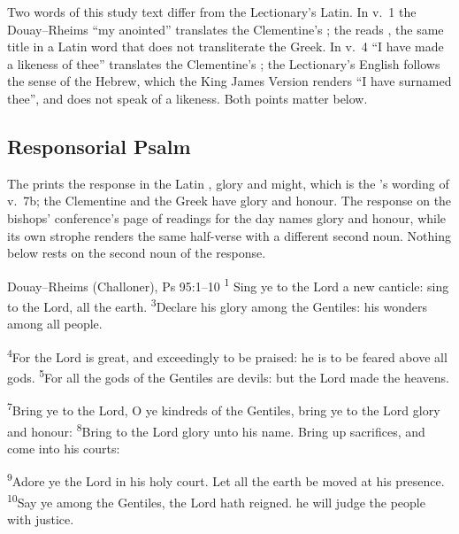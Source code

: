 \noindent Two words of this study text differ from the Lectionary's Latin.
In v.~1 the Douay--Rheims ``my anointed'' translates the Clementine's
; the  reads , the same title
in a Latin word that does not transliterate the Greek. In v.~4 ``I have made a
likeness of thee'' translates the Clementine's ; the
Lectionary's English follows the sense of the Hebrew, which the King James
Version renders ``I have surnamed thee'', and does not speak of a likeness.
Both points matter below.

\subsection{Responsorial Psalm}
\label{proper-responsorial-psalm}


\noindent The  prints the response in the Latin , glory and might, which is the 's wording of v.~7b; the Clementine and the Greek have glory and
honour. The response on the bishops' conference's page of readings for the day
names glory and honour, while its own strophe renders the same half-verse with
a different second noun. Nothing below rests on the second noun of the
response.

\begin{englishwitness}{Douay--Rheims (Challoner), Ps 95:1--10}
\textsuperscript{1} Sing ye to the Lord a new canticle: sing to the
Lord, all the earth. 
\textsuperscript{3}Declare his glory among the Gentiles: his wonders among all
people.

\textsuperscript{4}For the Lord is great, and exceedingly to be praised: he is
to be feared above all gods. \textsuperscript{5}For all the gods of the
Gentiles are devils: but the Lord made the heavens. 

\textsuperscript{7}Bring ye to the Lord, O ye kindreds of the Gentiles, bring
ye to the Lord glory and honour: \textsuperscript{8}Bring to the Lord glory
unto his name. Bring up sacrifices, and come into his courts:

\textsuperscript{9}Adore ye the Lord in his holy court. Let all the earth be
moved at his presence. \textsuperscript{10}Say ye among the Gentiles, the Lord
hath reigned.  he will judge the people with justice.
\end{englishwitness}

